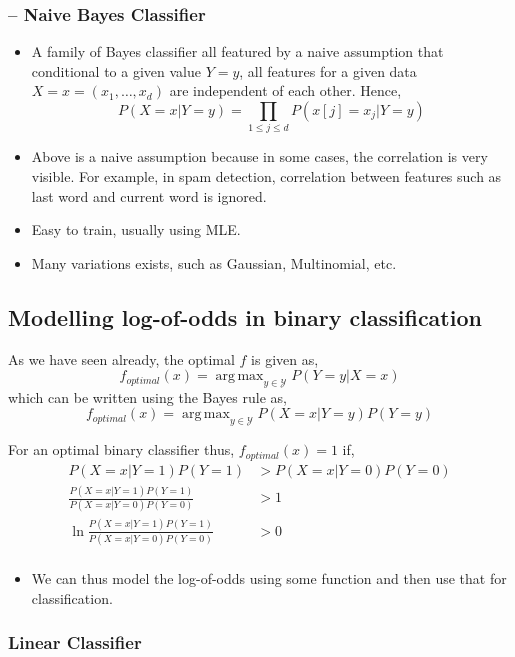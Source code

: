 \documentclass{article}
\DeclareMathOperator*{\argmax}{arg\,max}
\newcommand{\mcaly}{\mathcal{Y}}
\begin{document}
\subsubsection{-- Naive Bayes Classifier}
\begin{itemize}
    \item A family of Bayes classifier all featured by a naive assumption that conditional to a given value $Y=y$, all features for a given data $X=x=(x_1, \dots, x_d)$ are independent of each other. Hence,
        \begin{equation*}
            P(X=x|Y=y) =  \prod_{1 \leq j \leq d} P(x[j] = x_j | Y = y)
        \end{equation*}
    \item Above is a naive assumption because in some cases, the correlation is very visible. For example, in spam detection, correlation between features such as last word and current word is ignored.
    \item Easy to train, usually using MLE.
    \item Many variations exists, such as Gaussian, Multinomial, etc.
\end{itemize}

\subsection{Modelling log-of-odds in binary classification}
As we have seen already, the optimal $f$ is given as,
$$f_{optimal}(x) = \argmax_{y \in \mcaly} P(Y=y|X=x)$$
which can be written using the Bayes rule as,
$$f_{optimal}(x) = \argmax_{y \in \mcaly} P(X=x|Y=y)P(Y=y)$$

For an optimal binary classifier thus, $f_{optimal}(x) = 1$ if,
\begin{align*}
    P(X=x|Y=1)P(Y=1) &> P(X=x|Y=0)P(Y=0) \\
    \frac{P(X=x|Y=1)P(Y=1)}{P(X=x|Y=0)P(Y=0)} &> 1 \\
    \ln{\frac{P(X=x|Y=1)P(Y=1)}{P(X=x|Y=0)P(Y=0)}} &> 0 \\
\end{align*}

\begin{itemize}
    \item We can thus model the log-of-odds using some function and then use that for classification.
\end{itemize}

\subsubsection{Linear Classifier}
\end{document}
